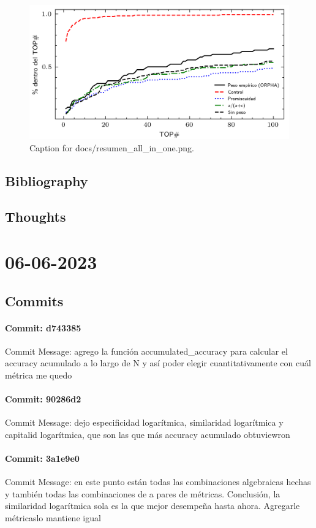 \documentclass{article}
\begin{document}
\begin{figure}[h] \centering \includegraphics{docs/resumen_all_in_one.png} \caption{Caption for docs/resumen_all_in_one.png.} \end{figure}
\subsection{Bibliography}
\subsection{Thoughts}

\section{06-06-2023}
\subsection{Commits}
\paragraph{Commit: d743385}
Commit Message: agrego la función accumulated_accuracy para calcular el accuracy acumulado a lo largo de N y así poder elegir cuantitativamente con cuál métrica me quedo

\paragraph{Commit: 90286d2}
Commit Message: dejo especificidad logarítmica, similaridad logarítmica y capitalid logarítmica, que son las que más accuracy acumulado obtuviewron

\paragraph{Commit: 3a1e9e0}
Commit Message: en este punto están todas las combinaciones algebraicas hechas y también todas las combinaciones de a pares de métricas. Conclusión, la similaridad logarítmica sola es la que mejor desempeña hasta ahora. Agregarle métricaslo mantiene igual
\end{document}
